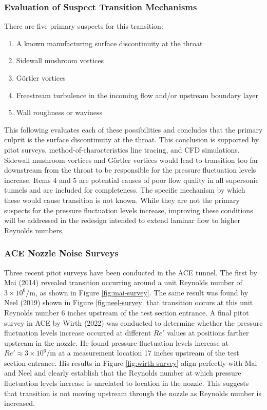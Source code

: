 \subsubsection{Evaluation of Suspect Transition Mechanisms}

There are five primary suspects for this transition:

\begin{enumerate}
    \item A known manufacturing surface discontinuity at the throat
    \item Sidewall mushroom vortices
    \item Görtler vortices
    \item Freestream turbulence in the incoming flow and/or upstream boundary layer
    \item Wall roughness or waviness
\end{enumerate}

This following evaluates each of these possibilities and concludes that the primary culprit is the surface discontinuity at the throat. This conclusion is supported by pitot surveys, method-of-characteristics line tracing, and CFD simulations. Sidewall mushroom vortices and Görtler vortices would lead to transition too far downstream from the throat to be responsible for the pressure fluctuation levels increase. Items 4 and 5 are potential causes of poor flow quality in all supersonic tunnels and are included for completeness. The specific mechanism by which these would cause transition is not known. While they are not the primary suspects for the pressure fluctuation levels increase, improving these conditions will be addressed in the redesign intended to extend laminar flow to higher Reynolds numbers.

\subsubsection*{ACE Nozzle Noise Surveys}

Three recent pitot surveys have been conducted in the ACE tunnel. The first by Mai (2014) revealed transition occurring around a unit Reynolds number of $3 \times 10^6/\mathrm{m}$, as shown in Figure \ref{fig:mai-survey}. The same result was found by Neel (2019) shown in Figure \ref{fig:neel-survey} that transition occurs at this unit Reynolds number 6 inches upstream of the test section entrance. A final pitot survey in ACE by Wirth (2022) was conducted to determine whether the pressure fluctuation levels increase occurred at different $Re'$ values at positions farther upstream in the nozzle. He found pressure fluctuation levels increase at $Re' \approx 3 \times 10^6/\mathrm{m}$ at a measurement location 17 inches upstream of the test section entrance. His results in Figure \ref{fig:wirth-survey} align perfectly with Mai and Neel and clearly establish that the Reynolds number at which pressure fluctuation levels increase is unrelated to location in the nozzle. This suggests that transition is not moving upstream through the nozzle as Reynolds number is increased.

